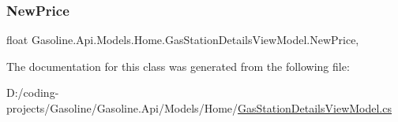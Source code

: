 \mbox{\label{class_gasoline_1_1_api_1_1_models_1_1_home_1_1_gas_station_details_view_model_a43fb2fd03fe8d2fd917f36028e7ea3bc}} 
\subsubsection{\texorpdfstring{NewPrice}{NewPrice}}
{\footnotesize\ttfamily float Gasoline.\+Api.\+Models.\+Home.\+Gas\+Station\+Details\+View\+Model.\+New\+Price\hspace{0.3cm}{\ttfamily [get]}, {\ttfamily [set]}}



The documentation for this class was generated from the following file\+:\begin{DoxyCompactItemize}
\item 
D\+:/coding-\/projects/\+Gasoline/\+Gasoline.\+Api/\+Models/\+Home/\mbox{\hyperlink{_gas_station_details_view_model_8cs}{Gas\+Station\+Details\+View\+Model.\+cs}}\end{DoxyCompactItemize}
